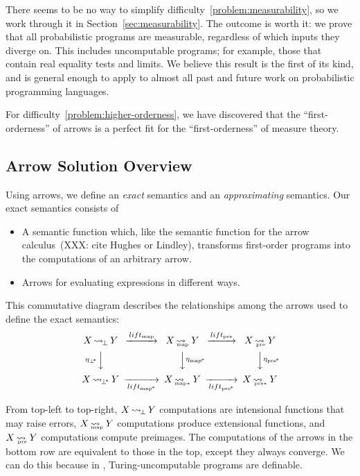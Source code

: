 \documentclass[preprint]{sigplanconf}
\newcommand{\arrow}{\rightsquigarrow}
\newcommand{\arrowlift}{\ensuremath{lift}}
\DeclareMathOperator{\botto}{\arrow_{\mspace{-3mu}\bot}}
\newcommand{\map}{_\mathrm{map}}
\DeclareMathOperator{\mapto}{\arrow_{\mspace{-21mu}\map}}
\newcommand{\liftmap}{\arrowlift\map}
\newcommand{\pre}{_\mathrm{pre}}
\DeclareMathOperator{\preto}{\arrow_{\mspace{-19mu}\pre}}
\newcommand{\liftpre}{\arrowlift\pre}
\newcommand{\pbot}{{\bot^{\mspace{-4mu}*}}}
\DeclareMathOperator{\pbotto}{\arrow_{\mspace{-3mu}\pbot}}
\newcommand{\pmap}{_\mathrm{map^{\mspace{-2mu}*}}}
\DeclareMathOperator{\pmapto}{\arrow_{\mspace{-22mu}_{\mathrm{map*}}}}
\newcommand{\liftpmap}{\arrowlift\pmap}
\newcommand{\ppre}{_\mathrm{pre^{\mspace{-2mu}*}}}
\DeclareMathOperator{\ppreto}{\arrow_{\mspace{-19mu}_{\mathrm{pre*}}}}
\newcommand{\liftppre}{\arrowlift\ppre}
\begin{document}
There seems to be no way to simplify difficulty~\ref{problem:measurability}, so we work through it in Section~\ref{sec:measurability}.
The outcome is worth it: we prove that all probabilistic programs are measurable, regardless of which inputs they diverge on.
This includes uncomputable programs; for example, those that contain real equality tests and limits.
We believe this result is the first of its kind, and is general enough to apply to almost all past and future work on probabilistic programming languages.

For difficulty~\ref{problem:higher-orderness}, we have discovered that the ``first-orderness'' of arrows is a perfect fit for the ``first-orderness'' of measure theory.

\subsection{Arrow Solution Overview}

\newcommand{\youarehere}[1]%
{%
\begin{equation}%
\begin{CD}%
X \botto Y   @>\liftmap>>   X \mapto Y   @>\liftpre>>   X \preto Y \\%
@V{\eta_\pbot}VV             @VV{\eta\pmap}V              @VV{\eta\ppre}V\\%
X \pbotto Y  @>>\liftpmap>  X \pmapto Y  @>>\liftppre>  X \ppreto Y%
\end{CD}%
\label{#1}%
\end{equation}%
}

Using arrows, we define an \emph{exact} semantics and an \emph{approximating} semantics.
Our exact semantics consists of
\begin{itemize}
	\item A semantic function which, like the semantic function for the arrow calculus~(XXX: cite Hughes or Lindley), transforms first-order programs into the computations of an arbitrary arrow.
	\item Arrows for evaluating expressions in different ways.
\end{itemize}
This commutative diagram describes the relationships among the arrows used to define the exact semantics:
\youarehere{eqn:roadmap-diagram1}
From top-left to top-right, $X \botto Y$ computations are intensional functions that may raise errors, $X \mapto Y$ computations produce extensional functions, and $X \preto Y$ computations compute preimages.
The computations of the arrows in the bottom row are equivalent to those in the top, except they always converge.
We can do this because in \lzfclang, Turing-uncomputable programs are definable.
\end{document}

